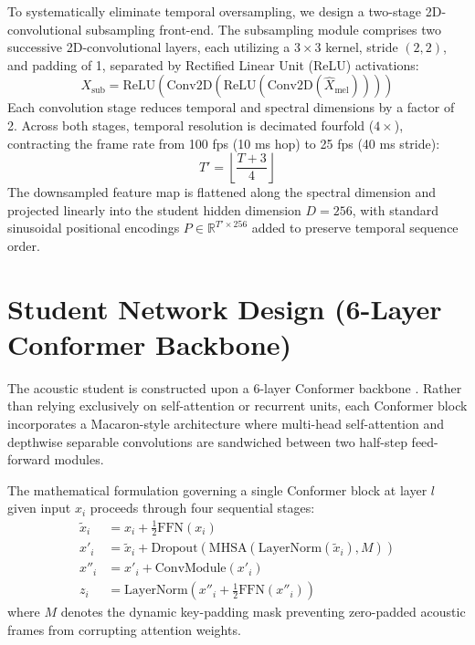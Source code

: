 To systematically eliminate temporal oversampling, we design a two-stage 2D-convolutional subsampling front-end. The subsampling module comprises two successive 2D-convolutional layers, each utilizing a $3 \times 3$ kernel, stride $(2, 2)$, and padding of 1, separated by Rectified Linear Unit (ReLU) activations:
\begin{equation}
    X_{\text{sub}} = \text{ReLU}\left(\text{Conv2D}\left(\text{ReLU}\left(\text{Conv2D}(\hat{X}_{\text{mel}})\right)\right)\right)
\end{equation}
Each convolution stage reduces temporal and spectral dimensions by a factor of 2. Across both stages, temporal resolution is decimated fourfold ($4\times$), contracting the frame rate from 100 fps (10 ms hop) to 25 fps (40 ms stride):
\begin{equation}
    T' = \left\lfloor \frac{T + 3}{4} \right\rfloor
\end{equation}
The downsampled feature map is flattened along the spectral dimension and projected linearly into the student hidden dimension $D = 256$, with standard sinusoidal positional encodings $P \in \mathbb{R}^{T' \times 256}$ added to preserve temporal sequence order.

\section{Student Network Design (6-Layer Conformer Backbone)}
The acoustic student is constructed upon a 6-layer Conformer backbone \cite{gulati2020conformer}. Rather than relying exclusively on self-attention or recurrent units, each Conformer block incorporates a Macaron-style architecture where multi-head self-attention and depthwise separable convolutions are sandwiched between two half-step feed-forward modules.

The mathematical formulation governing a single Conformer block at layer $l$ given input $x_i$ proceeds through four sequential stages:
\begin{align}
    \tilde{x}_i &= x_i + \frac{1}{2} \text{FFN}(x_i) \label{eq:conf_ffn1} \\
    x'_i &= \tilde{x}_i + \text{Dropout}\left(\text{MHSA}(\text{LayerNorm}(\tilde{x}_i), M)\right) \label{eq:conf_mhsa} \\
    x''_i &= x'_i + \text{ConvModule}(x'_i) \label{eq:conf_conv} \\
    z_i &= \text{LayerNorm}\left(x''_i + \frac{1}{2} \text{FFN}(x''_i)\right) \label{eq:conf_ffn2}
\end{align}
where $M$ denotes the dynamic key-padding mask preventing zero-padded acoustic frames from corrupting attention weights.

